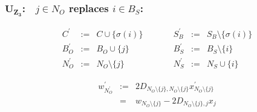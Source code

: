 \documentclass[a4paper]{article}
\begin{document}
\subsubsection{$\mathbf{U_{Z_{3}}}$:$\quad j \in N_{O}$ replaces $i \in B_{S}$:}
\begin{equation}
\label{update:o_z_rep_s}
\begin{array}{ccccccc}
C^{\prime}      &:=&  C \cup \{\sigma(i)\}
&\quad\quad&
S_{B}^{\prime}  &:=&  S_{B} \setminus  \{\sigma(i)\}   \\
B_{O}^{\prime}  &:=&  B_{O} \cup \{j\}
&\quad\quad&
B_{S}^{\prime}  &:=&  B_{S} \setminus \{i\} \\
N_{O}^{\prime}  &:=&  N_{O} \setminus \{j\}
&\quad\quad&
N_{S}^{\prime}  &:=&  N_{S} \cup \{i\}  
\end{array}
\end{equation}

\begin{eqnarray}
w_{N_{O}^{\prime}}^{\prime}
&:=&
2D_{N_{O} \setminus \{j\}, N_{O} \setminus \{j\}}
x_{N_{O} \setminus \{j\}}^{\prime}
\nonumber \\
&=&
w_{N_{O} \setminus \{j\}}
-
2D_{N_{O} \setminus \{j\}, j}x_{j}
\end{eqnarray}
\end{document}
